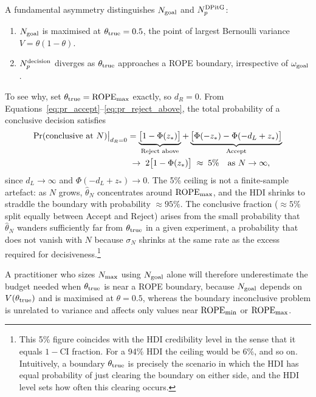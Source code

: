 A fundamental asymmetry distinguishes $N_{\rm goal}$ and $N_p^{\rm DPitG}$:

\begin{enumerate}[label=(\alph*)]
    \item $N_{\rm goal}$ is maximised at $\theta_{\rm true} = 0.5$, the point of largest
    Bernoulli variance $V = \theta(1-\theta)$.
    \item $N_p^{\rm decision}$ diverges as $\theta_{\rm true}$ approaches a ROPE boundary,
    irrespective of $\omega_{\rm goal}$.
\end{enumerate}

To see why, set $\theta_{\rm true} = \mathrm{ROPE}_{\rm max}$ exactly, so $d_R = 0$.
From Equations~\ref{eq:pr_accept}--\ref{eq:pr_reject_above}, the total probability of a
conclusive decision satisfies
\begin{align}
    \Pr(\text{conclusive at }N)\big|_{d_R=0}
    &= \underbrace{\bigl[1 - \Phi(z_*)\bigr]}_{\text{Reject above}}
     + \underbrace{\bigl[\Phi(-z_*) - \Phi(-d_L + z_*)\bigr]}_{\text{Accept}} \notag \\
    &\;\to\; 2\bigl[1 - \Phi(z_*)\bigr] \;\approx\; 5\%
    \quad \text{as } N \to \infty,\label{eq:boundary_conclusive}
\end{align}
since $d_L \to \infty$ and $\Phi(-d_L + z_*) \to 0$.
The 5\% ceiling is not a finite-sample artefact: as $N$ grows, $\hat\theta_N$ concentrates
around $\mathrm{ROPE}_{\rm max}$, and the HDI shrinks to straddle the boundary with
probability $\approx 95\%$.
The conclusive fraction ($\approx 5\%$ split equally between Accept and Reject) arises from
the small probability that $\hat\theta_N$ wanders sufficiently far from $\theta_{\rm true}$
in a given experiment, a probability that does not vanish with $N$ because $\sigma_N$ shrinks
at the same rate as the excess required for decisiveness.\footnote{This 5\% figure coincides
with the HDI credibility level in the sense that it equals $1 - \mathrm{CI}$ fraction.
For a 94\% HDI the ceiling would be 6\%, and so on. Intuitively, a boundary $\theta_{\rm true}$
is precisely the scenario in which the HDI has equal probability of just clearing the boundary
on either side, and the HDI level sets how often this clearing occurs.}

A practitioner who sizes $N_{\rm max}$ using $N_{\rm goal}$ alone will therefore
underestimate the budget needed when $\theta_{\rm true}$ is near a ROPE boundary, because
$N_{\rm goal}$ depends on $V(\theta_{\rm true})$ and is maximised at $\theta = 0.5$, whereas
the boundary inconclusive problem is unrelated to variance and affects only values near
$\mathrm{ROPE}_{\rm min}$ or $\mathrm{ROPE}_{\rm max}$.

